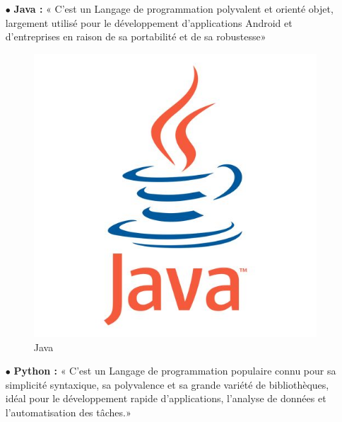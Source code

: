 \begin{itemize}
        \item[$\bullet$] \textbf{ Java :}
            « C'est un Langage de programmation polyvalent et orienté objet, largement utilisé pour le développement d'applications Android et d'entreprises en raison de sa portabilité et de sa robustesse»
              
            \begin{figure}[H]
                \centering \includegraphics[scale=0.2]{chap1.images/java.jpg}
                \caption{Java}
                \label{JAVA}
            \end{figure}

            
   
       \item[$\bullet$] \textbf{ Python :}
            « C'est un Langage de programmation populaire connu pour sa simplicité syntaxique, sa polyvalence et sa grande variété de bibliothèques, idéal pour le développement rapide d'applications, l'analyse de données et l'automatisation des tâches.»
              

\end{itemize}
